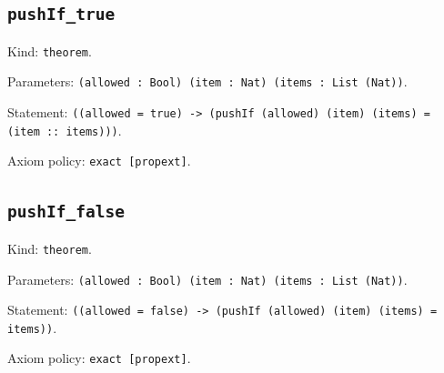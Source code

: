 \documentclass[11pt]{article}
\begin{document}
\subsection*{\texttt{pushIf\_true}}
\noindent Kind: \texttt{theorem}.\par
\noindent Parameters: \texttt{(allowed : Bool) (item : Nat) (items : List (Nat))}.\par
\noindent Statement: \texttt{((allowed = true) -> (pushIf (allowed) (item) (items) = (item :: items)))}.\par
\noindent Axiom policy: \texttt{exact [propext]}.\par
\subsection*{\texttt{pushIf\_false}}
\noindent Kind: \texttt{theorem}.\par
\noindent Parameters: \texttt{(allowed : Bool) (item : Nat) (items : List (Nat))}.\par
\noindent Statement: \texttt{((allowed = false) -> (pushIf (allowed) (item) (items) = items))}.\par
\noindent Axiom policy: \texttt{exact [propext]}.\par
\end{document}
